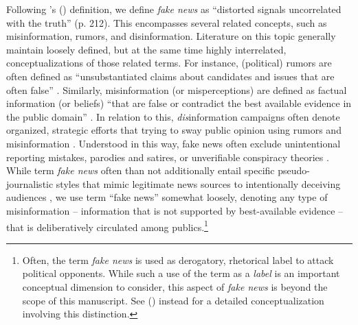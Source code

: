 \documentclass[man, 12pt, a4paper, noextraspace]{apa6}
\begin{document}
     Following \citeauthor{allcott2017social}'s (\citeyear{allcott2017social}) definition, we define \emph{fake news} as \enquote{distorted signals uncorrelated with the truth} (p. 212). This encompasses several related concepts, such as misinformation, rumors, and disinformation. Literature on this topic generally maintain loosely defined, but at the same time highly interrelated, conceptualizations of those related terms. For instance, (political) rumors are often defined as \enquote{unsubstantiated claims about candidates and issues that are often false} \parencite[p. 401]{weeks2014electoral}. Similarly, misinformation (or misperceptions) are defined as factual information (or beliefs) \enquote{that are false or contradict the best available evidence in the public domain} \parencite[p. 128]{flynn2017nature}. In relation to this, \emph{dis}information campaigns often denote organized, strategic efforts that trying to sway public opinion using rumors and misinformation \parencite{Garrett2017distraction, Lewandowsky_2012PSPI}. Understood in this way, fake news often exclude unintentional reporting mistakes, parodies and satires, or unverifiable conspiracy theories \parencite{allcott2017social}. While term \emph{fake news} often than not additionally entail specific pseudo-journalistic styles that mimic legitimate news sources to intentionally deceiving audiences \parencite{jana_sophie_fn}, we use term \enquote{fake news} somewhat loosely, denoting any type of misinformation -- information that is not supported by best-available evidence -- that is deliberatively circulated among publics.\footnote{  Often, the term \emph{fake news} is used as derogatory, rhetorical label to attack political opponents. While such a use of the term as a \emph{label} is an important conceptual dimension to consider, this aspect of \emph{fake news} is beyond the scope of this manuscript. See \citeauthor{jana_sophie_fn} (\citeyear{jana_sophie_fn}) instead for a detailed conceptualization involving this distinction.}
     
\end{document}

